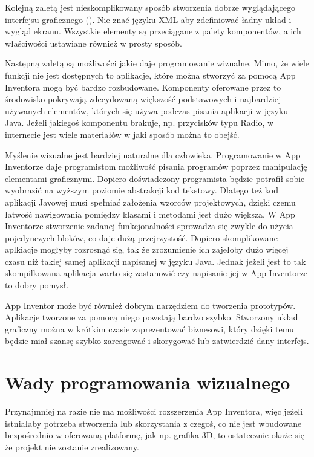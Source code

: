Kolejną zaletą jest nieskomplikowany sposób stworzenia dobrze wyglądającego interfejsu graficznego (). Nie znać języku XML aby zdefiniować ładny układ i wygląd ekranu. Wszystkie elementy są przeciągane z palety komponentów, a ich właściwości ustawiane również w prosty sposób.

Następną zaletą są możliwości jakie daje programowanie wizualne. Mimo, że wiele funkcji nie jest dostępnych to aplikacje, które można stworzyć za pomocą App Inventora mogą być bardzo rozbudowane. Komponenty oferowane przez to środowisko pokrywają zdecydowaną większość podstawowych i najbardziej używanych elementów, których się używa podczas pisania aplikacji w języku Java. Jeżeli jakiegoś komponentu brakuje, np. przycisków typu Radio, w internecie jest wiele materiałów w jaki sposób można to obejść.

Myślenie wizualne jest bardziej naturalne dla człowieka. Programowanie w App Inventorze daje programistom możliwość pisania programów poprzez manipulację elementami graficznymi. Dopiero doświadczony programista będzie potrafił sobie wyobrazić na wyższym poziomie abstrakcji kod tekstowy. Dlatego też kod aplikacji Javowej musi spełniać założenia wzorców projektowych, dzięki czemu łatwość nawigowania pomiędzy klasami i metodami jest dużo większa. W App Inventorze stworzenie zadanej funkcjonalności sprowadza się zwykle do użycia pojedynczych bloków, co daje dużą przejrzystość. Dopiero skomplikowane aplkiacje mogłyby rozrosnąć się, tak że zrozumienie ich zajełoby dużo więcej czasu niż takiej samej aplikacji napisanej w języku Java. Jednak jeżeli jest to tak skompilkowana aplikacja warto się zastanowić czy napisanie jej w App Inventorze to dobry pomysł.

App Inventor może być również dobrym narzędziem do tworzenia prototypów. Aplikacje tworzone za pomocą niego powstają bardzo szybko. Stworzony układ graficzny można w krótkim czasie zaprezentować biznesowi, który dzięki temu będzie miał szansę szybko zareagować i skorygować lub zatwierdzić dany interfejs.

\section{Wady programowania wizualnego}

Przynajmniej na razie nie ma możliwości rozszerzenia App Inventora, więc jeżeli istniałaby potrzeba stworzenia lub skorzystania z czegoś, co nie jest wbudowane bezpośrednio w oferowaną platformę, jak np. grafika 3D, to ostatecznie okaże się że projekt nie zostanie zrealizowany.

